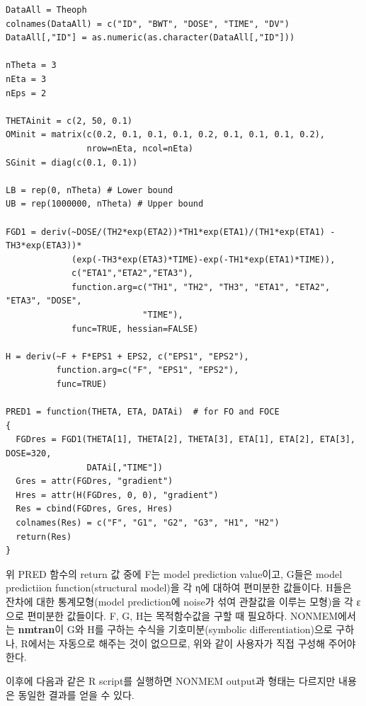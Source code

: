 \documentclass[
  10pt,
]{krantz}
\begin{document}
\begin{verbatim}
DataAll = Theoph
colnames(DataAll) = c("ID", "BWT", "DOSE", "TIME", "DV")
DataAll[,"ID"] = as.numeric(as.character(DataAll[,"ID"]))

nTheta = 3
nEta = 3
nEps = 2

THETAinit = c(2, 50, 0.1)
OMinit = matrix(c(0.2, 0.1, 0.1, 0.1, 0.2, 0.1, 0.1, 0.1, 0.2), 
                nrow=nEta, ncol=nEta)
SGinit = diag(c(0.1, 0.1))

LB = rep(0, nTheta) # Lower bound
UB = rep(1000000, nTheta) # Upper bound

FGD1 = deriv(~DOSE/(TH2*exp(ETA2))*TH1*exp(ETA1)/(TH1*exp(ETA1) - TH3*exp(ETA3))*
             (exp(-TH3*exp(ETA3)*TIME)-exp(-TH1*exp(ETA1)*TIME)),
             c("ETA1","ETA2","ETA3"),
             function.arg=c("TH1", "TH2", "TH3", "ETA1", "ETA2", "ETA3", "DOSE",
                           "TIME"),
             func=TRUE, hessian=FALSE)

H = deriv(~F + F*EPS1 + EPS2, c("EPS1", "EPS2"), 
          function.arg=c("F", "EPS1", "EPS2"), 
          func=TRUE)

PRED1 = function(THETA, ETA, DATAi)  # for FO and FOCE
{
  FGDres = FGD1(THETA[1], THETA[2], THETA[3], ETA[1], ETA[2], ETA[3], DOSE=320, 
                DATAi[,"TIME"])
  Gres = attr(FGDres, "gradient")
  Hres = attr(H(FGDres, 0, 0), "gradient")
  Res = cbind(FGDres, Gres, Hres)
  colnames(Res) = c("F", "G1", "G2", "G3", "H1", "H2")
  return(Res)
}
\end{verbatim}

위 PRED 함수의 return 값 중에 F는 model prediction value이고, G들은 model
predictiion function(structural model)을 각 η에 대하여 편미분한 값들이다. H들은 잔차에 대한
통계모형(model prediction에 noise가 섞여 관찰값을 이루는 모형)을 각 ε으로 편미분한 값들이다. F,
G, H는 목적함수값을 구할 때 필요하다. NONMEM에서는 \textbf{nmtran}이 G와 H를 구하는 수식을
기호미분(symbolic differentiation)으로 구하나, R에서는 자동으로 해주는 것이 없으므로, 위와
같이 사용자가 직접 구성해 주어야 한다.

이후에 다음과 같은 R script를 실행하면 NONMEM output과 형태는 다르지만 내용은 동일한 결과를 얻을 수 있다.
\end{document}
